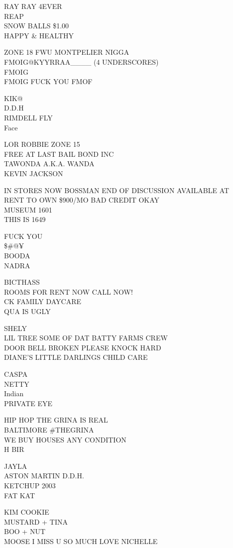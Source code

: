 \documentclass[10pt,letterpaper]{article}
\begin{document}
RAY RAY 4EVER\\
REAP\\
SNOW BALLS \$1.00\\
HAPPY \& HEALTHY

ZONE 18 FWU MONTPELIER NIGGA\\
FMOIG@KYYRRAA\_\_\_\_ (4 UNDERSCORES)\\
FMOIG\\
FMOIG FUCK YOU FMOF

KIK@\\
D.D.H\\
RIMDELL FLY\\
Face

LOR ROBBIE ZONE 15\\
FREE AT LAST BAIL BOND INC\\
TAWONDA A.K.A. WANDA\\
KEVIN JACKSON

IN STORES NOW BOSSMAN END OF DISCUSSION AVAILABLE AT\\
RENT TO OWN \$900/MO BAD CREDIT OKAY\\
MUSEUM 1601\\
THIS IS 1649

FUCK YOU\\
\$\#@¥\\
BOODA\\
NADRA

BICTHASS\\
ROOMS FOR RENT NOW CALL NOW!\\
CK FAMILY DAYCARE\\
QUA IS UGLY

SHELY\\
LIL TREE SOME OF DAT BATTY FARMS CREW\\
DOOR BELL BROKEN PLEASE KNOCK HARD\\
DIANE'S LITTLE DARLINGS CHILD CARE

CASPA\\
NETTY\\
Indian\\
PRIVATE EYE

HIP HOP THE GRINA IS REAL\\
BALTIMORE \#THEGRINA\\
WE BUY HOUSES ANY CONDITION\\
H BIR

JAYLA\\
ASTON MARTIN D.D.H.\\
KETCHUP 2003\\
FAT KAT

KIM COOKIE\\
MUSTARD + TINA\\
BOO + NUT\\
MOOSE I MISS U SO MUCH LOVE NICHELLE
\end{document}
